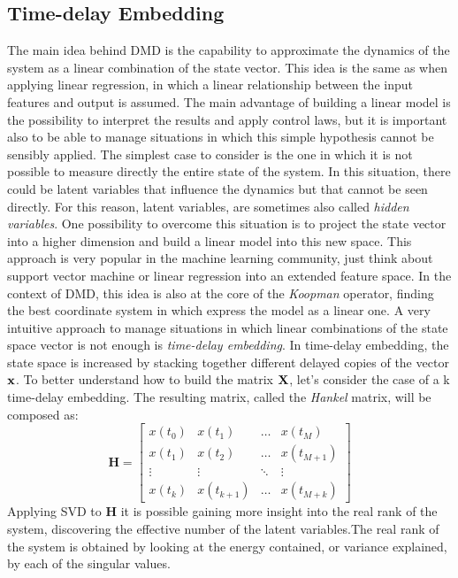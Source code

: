 \documentclass[]{article}
\begin{document}
\subsection{Time-delay Embedding}
The main idea behind DMD is the capability to approximate the dynamics of the system as a linear combination of the state vector. This idea is the same as when applying linear regression, in which a linear relationship between the input features and output is assumed. The main advantage of building a linear model is the possibility to interpret the results and apply control laws, but it is important also to be able to manage situations in which this simple hypothesis cannot be sensibly applied. The simplest case to consider is the one in which it is not possible to measure directly the entire state of the system. In this situation, there could be latent variables that influence the dynamics but that cannot be seen directly. For this reason, latent variables, are sometimes also called \textit{hidden variables}. One possibility to overcome this situation is to project the state vector into a higher dimension and build a linear model into this new space. This approach is very popular in the machine learning community, just think about support vector machine or linear regression into an extended feature space. In the context of DMD, this idea is also at the core of the \textit{Koopman} operator, finding the best coordinate system in which express the model as a linear one. A very intuitive approach to manage situations in which linear combinations of the state space vector is not enough is \textit{time-delay embedding}. In time-delay embedding, the state space is increased by stacking together different delayed copies of the vector $\textbf x$. To better understand how to build the matrix $\textbf X$, let's consider the case of a k time-delay embedding. The resulting matrix, called the \textit{Hankel} matrix, will be composed as:
\begin{equation}
\textbf{H} = 
    \begin{bmatrix}
        x(t_0) & x(t_1) & \dots &  x(t_M)\\
        x(t_1) & x(t_2) & \dots &  x(t_{M+1})\\
        \vdots &  \vdots & \ddots &  \vdots \\
        x(t_k) & x(t_{k+1}) & \dots &  x(t_{M+k}) 
    \end{bmatrix}
\end{equation}
Applying SVD to $\textbf{H}$ it is possible gaining more insight into the real rank of the system, discovering the effective number of the latent variables.The real rank of the system is obtained by looking at the energy contained, or variance explained, by each of the singular values.
\end{document}
